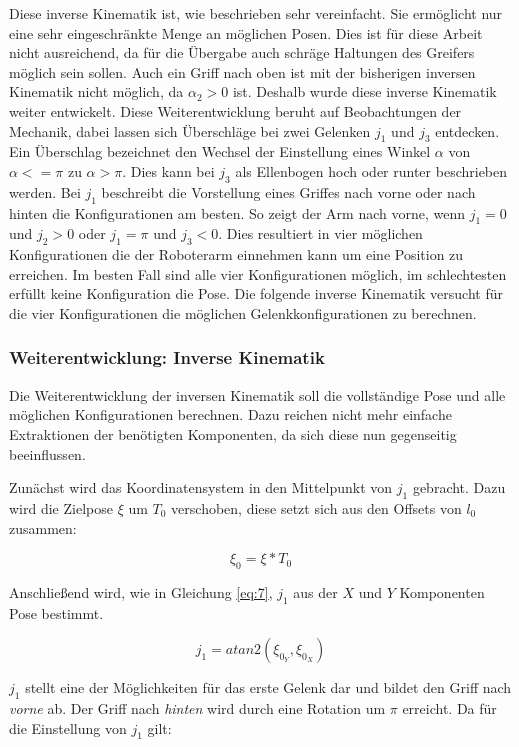 Diese inverse Kinematik ist, wie beschrieben sehr vereinfacht. Sie ermöglicht nur eine sehr eingeschränkte Menge an möglichen Posen. Dies ist für diese Arbeit nicht ausreichend, da für die Übergabe auch schräge Haltungen des Greifers möglich sein sollen. Auch ein Griff nach oben ist mit der bisherigen inversen Kinematik nicht möglich, da $\alpha_2 > 0$ ist. Deshalb wurde diese inverse Kinematik weiter entwickelt. Diese Weiterentwicklung beruht auf Beobachtungen der Mechanik, dabei lassen sich Überschläge bei zwei Gelenken $j_1$ und $j_3$ entdecken. Ein Überschlag bezeichnet den Wechsel der Einstellung eines Winkel $\alpha$ von $\alpha <= \pi$ zu $\alpha > \pi$. Dies kann bei $j_3$ als Ellenbogen hoch oder runter beschrieben werden. Bei $j_1$ beschreibt die Vorstellung eines Griffes nach vorne oder nach hinten die Konfigurationen am besten. So zeigt der Arm nach vorne, wenn $j_1 = 0$ und $j_2 > 0$ oder $j_1 = \pi$ und $j_3 < 0$. Dies resultiert in vier möglichen Konfigurationen die der Roboterarm einnehmen kann um eine Position zu erreichen. Im besten Fall sind alle vier Konfigurationen möglich, im schlechtesten erfüllt keine Konfiguration die Pose. Die folgende inverse Kinematik versucht für die vier Konfigurationen die möglichen Gelenkkonfigurationen zu berechnen.

\subsubsection{Weiterentwicklung: Inverse Kinematik}
Die Weiterentwicklung der inversen Kinematik soll die vollständige Pose und alle möglichen Konfigurationen berechnen. Dazu reichen nicht mehr einfache Extraktionen der benötigten Komponenten, da sich diese nun gegenseitig beeinflussen. 

Zunächst wird das Koordinatensystem in den Mittelpunkt von $j_1$ gebracht. Dazu wird die Zielpose $\xi$ um $T_0$ verschoben, diese setzt sich aus den Offsets von $l_0$ zusammen:

\begin{equation}
\xi_0 = \xi * T_0
\label{eq:15}
\end{equation}

Anschließend wird, wie in Gleichung \ref{eq:7}, $j_1$ aus der $X$ und $Y$ Komponenten Pose bestimmt.

\begin{equation}
j_1 = atan2(\xi_{0_Y},\xi_{0_X})
\label{eq:16}
\end{equation}

$j_1$ stellt eine der Möglichkeiten für das erste Gelenk dar und bildet den Griff nach \textit{vorne} ab. Der Griff nach \textit{hinten} wird durch eine Rotation um $\pi$ erreicht. Da für die Einstellung von $j_1$ gilt:

